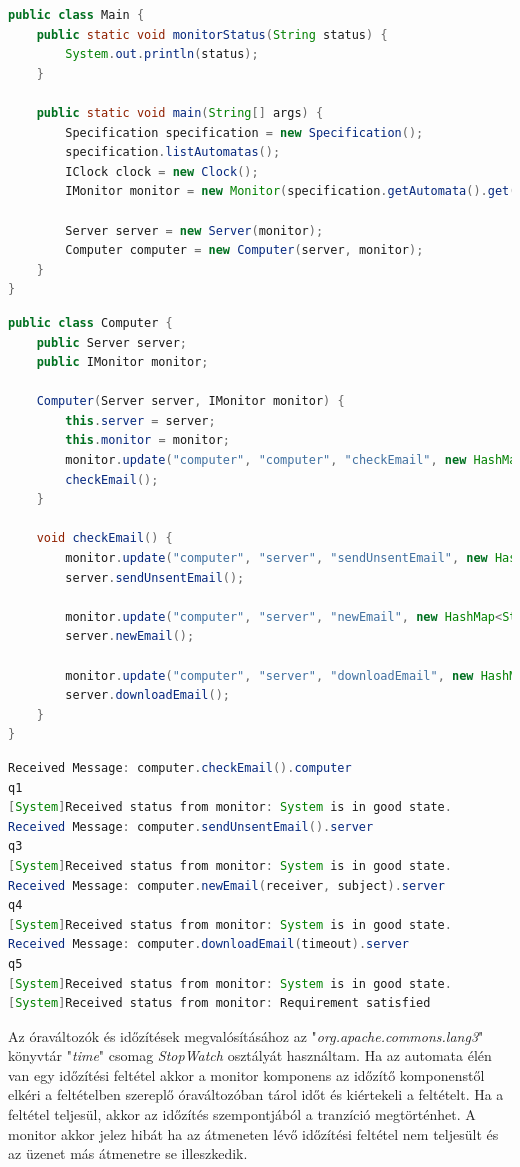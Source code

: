 \begin{lstlisting}[language=java, frame=single, float=ht!, caption={Időzítéses példához tartozó Main osztály.},captionpos=b,label=computer_main]
public class Main {
	public static void monitorStatus(String status) {
		System.out.println(status);
	}

	public static void main(String[] args) {
		Specification specification = new Specification();
		specification.listAutomatas();
		IClock clock = new Clock();
		IMonitor monitor = new Monitor(specification.getAutomata().get(0), clock);

		Server server = new Server(monitor);
		Computer computer = new Computer(server, monitor);
	}
}
\end{lstlisting}

\begin{lstlisting}[language=java, frame=single, float=ht!, caption={A Computer java osztálya.},captionpos=b,label=computer_java]
public class Computer {
	public Server server;
	public IMonitor monitor;

	Computer(Server server, IMonitor monitor) {
		this.server = server;
		this.monitor = monitor;
		monitor.update("computer", "computer", "checkEmail", new HashMap<String, Object>());
		checkEmail();
	}

	void checkEmail() {
		monitor.update("computer", "server", "sendUnsentEmail", new HashMap<String, Object>());
		server.sendUnsentEmail();

		monitor.update("computer", "server", "newEmail", new HashMap<String, Object>());
		server.newEmail();

		monitor.update("computer", "server", "downloadEmail", new HashMap<String, Object>());
		server.downloadEmail();
	}
}
\end{lstlisting}

\begin{lstlisting}[language=java, frame=single, float=ht!, caption={Időzítéses példa monitor kimenete.},captionpos=b,label=computer_monitor]
Received Message: computer.checkEmail().computer
q1
[System]Received status from monitor: System is in good state.
Received Message: computer.sendUnsentEmail().server
q3
[System]Received status from monitor: System is in good state.
Received Message: computer.newEmail(receiver, subject).server
q4
[System]Received status from monitor: System is in good state.
Received Message: computer.downloadEmail(timeout).server
q5
[System]Received status from monitor: System is in good state.
[System]Received status from monitor: Requirement satisfied
\end{lstlisting}

Az óraváltozók és időzítések megvalósításához az "\textit{org.apache.commons.lang3}" könyvtár "\textit{time}" csomag \textit{StopWatch} osztályát használtam.
Ha az automata élén van egy időzítési feltétel akkor a monitor komponens az időzítő komponenstől elkéri a feltételben szereplő óraváltozóban tárol időt és kiértekeli a feltételt.
Ha a feltétel teljesül, akkor az időzítés szempontjából a tranzíció megtörténhet.
A monitor akkor jelez hibát ha az átmeneten lévő időzítési feltétel nem teljesült és az üzenet más átmenetre se illeszkedik.